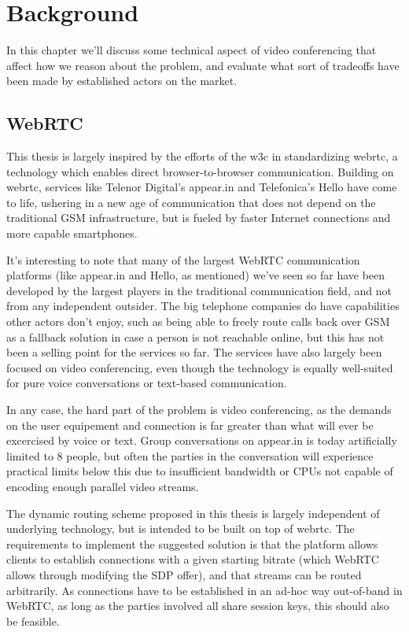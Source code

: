 \chapter{Background}
\label{chp:background}

In this chapter we'll discuss some technical aspect of video conferencing that affect how we reason about the problem, and evaluate what sort of tradeoffs have been made by established actors on the market.

\section{WebRTC}

This thesis is largely inspired by the efforts of the \gls{w3c} in standardizing \gls{webrtc}, a technology which enables direct browser-to-browser communication. Building on \gls{webrtc}, services like Telenor Digital's appear.in and Telefonica's Hello have come to life, ushering in a new age of communication that does not depend on the traditional GSM infrastructure, but is fueled by faster Internet connections and more capable smartphones.

It's interesting to note that many of the largest WebRTC communication platforms (like appear.in and Hello, as mentioned) we've seen so far have been developed by the largest players in the traditional communication field, and not from any independent outsider. The big telephone companies do have capabilities other actors don't enjoy, such as being able to freely route calls back over GSM as a fallback solution in case a person is not reachable online, but this has not been a selling point for the services so far. The services have also largely been focused on video conferencing, even though the technology is equally well-suited for pure voice conversations or text-based communication.

In any case, the hard part of the problem is video conferencing, as the demands on the user equipement and connection is far greater than what will ever be excercised by voice or text. Group conversations on appear.in is today artificially limited to 8 people, but often the parties in the conversation will experience practical limits below this due to insufficient bandwidth or CPUs not capable of encoding enough parallel video streams.

The dynamic routing scheme proposed in this thesis is largely independent of underlying technology, but is intended to be built on top of \gls{webrtc}. The requirements to implement the suggested solution is that the platform allows clients to establish connections with a given starting bitrate (which WebRTC allows through modifying the SDP offer), and that streams can be routed arbitrarily. As connections have to be established in an ad-hoc way out-of-band in WebRTC, as long as the parties involved all share session keys, this should also be feasible.



